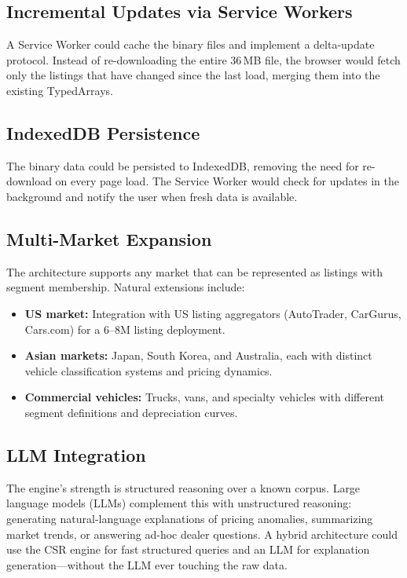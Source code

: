 \documentclass[11pt,a4paper,twoside]{book}
\begin{document}
\subsection{Incremental Updates via Service Workers}

A Service Worker could cache the binary files and implement a delta-update protocol. Instead
of re-downloading the entire 36\,MB file, the browser would fetch only the listings that have
changed since the last load, merging them into the existing TypedArrays.

\subsection{IndexedDB Persistence}

The binary data could be persisted to IndexedDB, removing the need for re-download on every
page load. The Service Worker would check for updates in the background and notify the user
when fresh data is available.

\subsection{Multi-Market Expansion}

The architecture supports any market that can be represented as listings with segment
membership. Natural extensions include:

\begin{itemize}[leftmargin=*]
    \item \textbf{US market:} Integration with US listing aggregators (AutoTrader, CarGurus,
          Cars.com) for a 6--8M listing deployment.
    \item \textbf{Asian markets:} Japan, South Korea, and Australia, each with distinct
          vehicle classification systems and pricing dynamics.
    \item \textbf{Commercial vehicles:} Trucks, vans, and specialty vehicles with different
          segment definitions and depreciation curves.
\end{itemize}

\subsection{LLM Integration}

The engine's strength is structured reasoning over a known corpus. Large language models
(LLMs) complement this with unstructured reasoning: generating natural-language explanations
of pricing anomalies, summarizing market trends, or answering ad-hoc dealer questions.
A hybrid architecture could use the CSR engine for fast structured queries and an LLM for
explanation generation---without the LLM ever touching the raw data.
\end{document}
